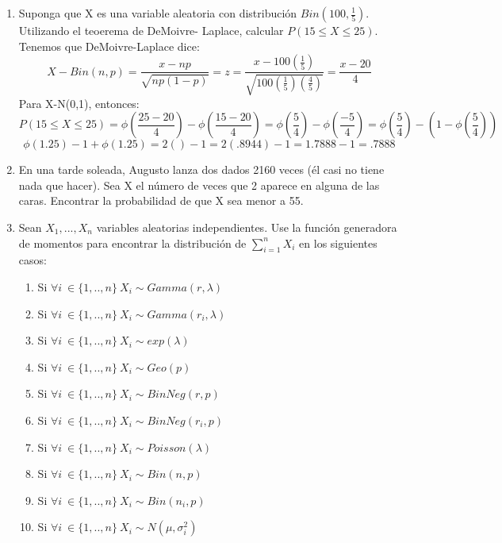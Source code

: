 \documentclass[11pt,a4paper]{report}
\begin{document}
\begin{enumerate}
{\begin{enumerate}
		    \end{enumerate}
          
            
		}

		\item{
		Suponga que X es una variable aleatoria con distribución $Bin(100,\frac{1}{5})$. Utilizando el teoerema de DeMoivre-
		Laplace, calcular $P(15\leq X \leq 25)$. \\
		Tenemos que DeMoivre-Laplace dice:
		\[X-Bin(n,p) =\frac{x-np}{\sqrt{np(1-p)}} = z = \frac{x - 100(\frac{1}{5})}{\sqrt{100(\frac{1}{5})(\frac{4}{5})}} =
		\frac{x - 20}{4}\]
		Para X-N(0,1), entonces:
		\[P(15 \leq X \leq 25) = \phi(\frac{25 - 20}{4}) - \phi(\frac{15 - 20}{4})  = 
		\phi(\frac{5}{4}) - \phi(\frac{-5}{4}) = \phi(\frac{5}{4}) - (1 - \phi(\frac{5}{4}))\]
		\[\phi(1.25) - 1 + \phi(1.25) = 2( ) - 1 = 2(.8944) - 1 = 1.7888 - 1 = .7888\]
		
		}

		\item{
            En una tarde soleada, Augusto lanza dos dados 2160 veces (él casi no tiene nada que hacer). Sea X el número de veces que 2 aparece en alguna de las caras. Encontrar la probabilidad de que X sea menor a 55.
		}

		\item{
			Sean $X_{1},...,X_{n}$ variables aleatorias independientes. Use la función generadora de momentos para encontrar la distribución de $\sum_{i=1}^{n}X_{i}$ en los siguientes casos:\\
			\begin{enumerate}
			    \item {Si $\forall i \ \in \lbrace 1,..,n \rbrace \ X_{i} \sim Gamma(r,\lambda)$}
			    
			    \item{Si $\forall i \ \in \lbrace 1,..,n \rbrace \ X_{i} \sim Gamma(r_{i},\lambda)$ }
                \item{Si $\forall i \ \in \lbrace 1,..,n \rbrace \ X_{i} \sim exp(\lambda)$ }
                \item{Si $\forall i \ \in \lbrace 1,..,n \rbrace \ X_{i} \sim Geo(p)$ }
                \item{Si $\forall i \ \in \lbrace 1,..,n \rbrace \ X_{i} \sim BinNeg(r,p)$ }
                \item{Si $\forall i \ \in \lbrace 1,..,n \rbrace \ X_{i} \sim BinNeg(r_{i},p)$ }
                \item{Si $\forall i \ \in \lbrace 1,..,n \rbrace \ X_{i} \sim Poisson(\lambda)$ }
                \item{Si $\forall i \ \in \lbrace 1,..,n \rbrace \ X_{i} \sim Bin(n,p)$ }
                \item{Si $\forall i \ \in \lbrace 1,..,n \rbrace \ X_{i} \sim Bin(n_{i},p)$ }
                \item{Si $\forall i \ \in \lbrace 1,..,n \rbrace \ X_{i} \sim N(\mu,\sigma_{i}^2)$ }
			\end{enumerate}
		}


\end{enumerate}
\end{document}
